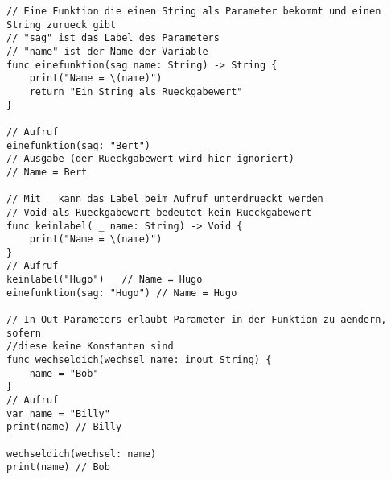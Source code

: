 \begin{lstlisting}
// Eine Funktion die einen String als Parameter bekommt und einen String zurueck gibt
// "sag" ist das Label des Parameters
// "name" ist der Name der Variable
func einefunktion(sag name: String) -> String {
	print("Name = \(name)")
	return "Ein String als Rueckgabewert"
}

// Aufruf
einefunktion(sag: "Bert")
// Ausgabe (der Rueckgabewert wird hier ignoriert)
// Name = Bert

// Mit _ kann das Label beim Aufruf unterdrueckt werden
// Void als Rueckgabewert bedeutet kein Rueckgabewert
func keinlabel( _ name: String) -> Void {
	print("Name = \(name)")
}
// Aufruf
keinlabel("Hugo") 	// Name = Hugo
einefunktion(sag: "Hugo") // Name = Hugo

// In-Out Parameters erlaubt Parameter in der Funktion zu aendern, sofern 
//diese keine Konstanten sind
func wechseldich(wechsel name: inout String) {
	name = "Bob"
}
// Aufruf
var name = "Billy"
print(name) // Billy

wechseldich(wechsel: name)
print(name) // Bob
\end{lstlisting}

